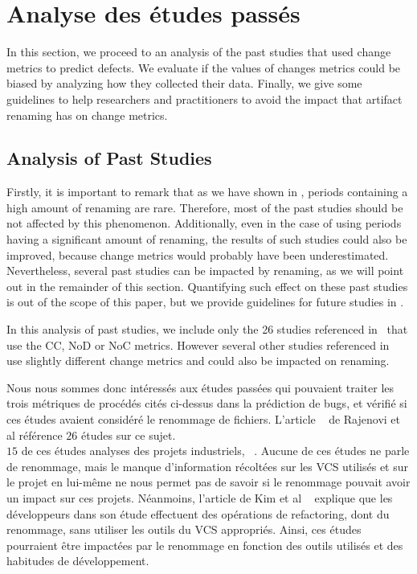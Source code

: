 \section{Analyse des études passés}
\label{sec:analyse}

In this section, we proceed to an analysis of the past studies that used change metrics to predict defects. We evaluate if the values of changes metrics could be biased by analyzing how they collected their data. Finally, we give some guidelines to help researchers and practitioners to avoid the impact that artifact renaming has on change metrics.

\subsection{Analysis of Past Studies}

Firstly, it is important to remark that as we have shown in , periods containing a high amount of renaming are rare. Therefore, most of the past studies should be not affected by this phenomenon. Additionally, even in the case of using periods having a significant amount of renaming, the results of such studies could also be improved, because change metrics would probably have been underestimated. Nevertheless, several past studies can be impacted by renaming, as we will point out in the remainder of this section. Quantifying such effect on these past studies is out of the scope of this paper, but we provide guidelines for future studies in .

In this analysis of past studies, we include only the 26 studies referenced in~\cite{radjenovic_software_2013} that use the CC, NoD or NoC metrics. However several other studies referenced in~\cite{radjenovic_software_2013} use slightly different change metrics and could also be impacted on renaming.

Nous nous sommes donc intéressés aux études passées qui pouvaient traiter les trois métriques de procédés cités ci-dessus dans la prédiction de bugs, et vérifié si ces études avaient considéré le renommage de fichiers. L'article ~\cite{radjenovic_software_2013} de Rajenovi et al référence $26$ études sur ce sujet.\\

$15$ de ces études analyses des projets industriels, ~\cite{arisholm_systematic_2010,graves_predicting_2000,khoshgoftaar_using_2000,layman_iterative_2008,munson_code_1998,nagappan_use_2005,nagappan_influence_2008,nagappan_using_2007,nagappan_using_2006,nagappan_change_2010,nikora_building_2006,ostrand_programmer-based_2010,weyuker_too_2008,weyuker_using_2007,yuan_application_2000}. Aucune de ces études ne parle de renommage, mais le manque d'information récoltées sur les VCS utilisés et sur le projet en lui-même ne nous permet pas de savoir si le renommage pouvait avoir un impact sur ces projets. Néanmoins, l'article de Kim et al ~\cite{kim_field_2012} explique que les développeurs dans son étude effectuent des opérations de refactoring, dont du renommage, sans utiliser les outils du VCS appropriés. Ainsi, ces études pourraient être impactées par le renommage en fonction des outils utilisés et des habitudes de développement.\\

